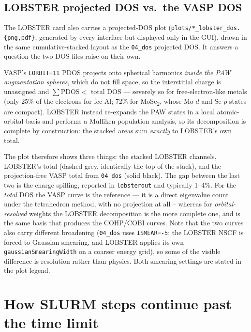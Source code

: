 \documentclass[11pt,a4paper]{scrartcl}
\begin{document}
\subsection{LOBSTER projected DOS vs.\ the VASP DOS}
\label{app:lobster-dos}

The LOBSTER card also carries a projected-DOS plot
(\texttt{plots/*\_lobster\_dos.\{png,pdf\}}, generated by every interface
but displayed only in the GUI), drawn in the same cumulative-stacked layout as
the \texttt{04\_dos} projected DOS.  It answers a question the two DOS files
raise on their own.

VASP's \texttt{LORBIT=11} PDOS projects onto spherical harmonics \emph{inside
the PAW augmentation spheres}, which do not fill space, so the interstitial
charge is unassigned and $\sum \mathrm{PDOS} < $ total DOS --- severely so for
free-electron-like metals (only 25\% of the electrons for fcc Al; 72\% for
MoSe\textsubscript{2}, whose Mo-$d$ and Se-$p$ states are compact).  LOBSTER
instead re-expands the PAW states in a local atomic-orbital basis and performs
a Mulliken population analysis, so its decomposition is complete by
construction: the stacked areas sum \emph{exactly} to LOBSTER's own total.

The plot therefore shows three things: the stacked LOBSTER channels, LOBSTER's
total (dashed grey, identically the top of the stack), and the projection-free
VASP total from \texttt{04\_dos} (solid black).  The gap between the last two
is the charge spilling, reported in \texttt{lobsterout} and typically 1--4\%.
For the \emph{total} DOS the VASP curve is the reference --- it is a direct
eigenvalue count under the tetrahedron method, with no projection at all --
whereas for \emph{orbital-resolved} weights the LOBSTER decomposition is the
more complete one, and is the same basis that produces the COHP/COBI curves.
Note that the two curves also carry different broadening (\texttt{04\_dos} uses
\texttt{ISMEAR=-5}; the LOBSTER NSCF is forced to Gaussian smearing, and
LOBSTER applies its own \texttt{gaussianSmearingWidth} on a coarser energy
grid), so some of the visible difference is resolution rather than physics.
Both smearing settings are stated in the plot legend.

\section{How SLURM steps continue past the time limit}
\label{sec:slurm-continue}
\end{document}
